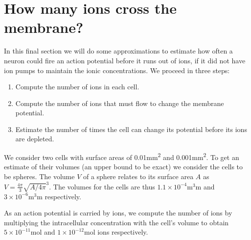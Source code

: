 \section{How many ions cross the membrane?}

In this final section we will do some approximations to estimate how often a neuron could fire an action potential before it runs out of ions, if it did not have ion pumps to maintain the ionic concentrations. We proceed in three steps:
\begin{enumerate}
\item Compute the number of ions in each cell.
\item Compute the number of ions that must flow to change the membrane potential.
\item Estimate the number of times the cell can change its potential before its ions are depleted.
\end{enumerate}
We consider two cells with surface areas of 0.01\si{\square\milli\meter} and 0.001\si{\square\milli\meter}. To get an estimate of their volumes (an upper bound to be exact) we consider the cells to be spheres. The volume $V$ of a sphere relates to its surface area $A$ as $V=\frac{4\pi}{3}\sqrt{A/4\pi}^3$. The volumes for the cells are thus $1.1 \times 10^{-4}\si{\cubic\milli\meter}$ and $3 \times 10^{-6}\si{\cubic\milli\meter}$ respectively.

As an action potential is carried by  ions, we compute the number of  ions by multiplying the intracellular concentration with the cell's volume to obtain $5 \times 10^{-11}\si{\mole}$ and $1 \times 10^{-12}\si{\mole}$  ions respectively.

